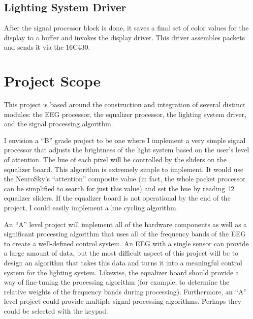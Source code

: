 \documentclass[letterpaper,10pt,notitlepage]{report}
\begin{document}
    \subsection{Lighting System Driver}
        
        After the signal processor block is done, it saves a final set of 
        color values for the display to a buffer and invokes the display 
        driver.  This driver assembles packets and sends it via the 16C430.

\section{Project Scope}
    This project is based around the construction and integration of several 
    distinct modules: the EEG processor, the equalizer processor, the lighting 
    system driver, and the signal processing algorithm.

    I envision a ``B'' grade project to be one where I implement a very simple 
    signal processor that adjusts the brightness of the light system based on 
    the user's level of attention.  The hue of each pixel will be controlled 
    by the sliders on the equalizer board.  This algorithm is extremely simple 
    to implement.  It would use the NeuroSky's ``attention'' composite value 
    (in fact, the whole packet processor can be simplified to search for just 
    this value) and set the hue by reading 12 equalizer sliders.  If the 
    equalizer board is not operational by the end of the project, I could 
    easily implement a hue cycling algorithm.

    An ``A'' level project will implement all of the hardware components as 
    well as a significant processing algorithm that uses all of the frequency 
    bands of the EEG to create a well-defined control system.  An EEG with a 
    single sensor can provide a large amount of data, but the most difficult 
    aspect of this project will be to design an algorithm that takes this data 
    and turns it into a meaningful control system for the lighting system.  
    Likewise, the equalizer board should provide a way of fine-tuning the 
    processing algorithm (for example, to determine the relative weights of 
    the frequency bands during processing).  Furthermore, an ``A'' level 
    project could provide multiple signal processing algorithms.  Perhaps they 
    could be selected with the keypad.
\end{document}
